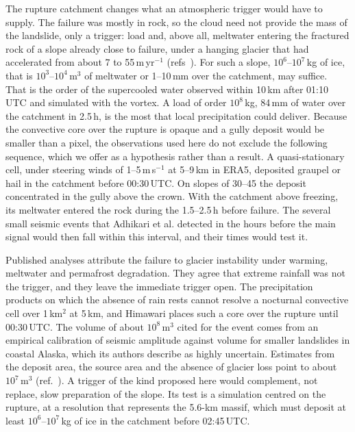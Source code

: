 \documentclass{nature}
\begin{document}
The rupture catchment changes what an atmospheric trigger would have to supply. The failure was mostly in rock\cite{adhikari2026,petley2026}, so the cloud need not provide the mass of the landslide, only a trigger: load and, above all, meltwater entering the fractured rock of a slope already close to failure, under a hanging glacier that had accelerated from about 7 to 55\,m\,yr$^{-1}$ (refs~). For such a slope, $10^{6}$--$10^{7}$\,kg of ice, that is $10^{3}$--$10^{4}$\,m$^{3}$ of meltwater or 1--10\,mm over the catchment, may suffice. That is the order of the supercooled water observed within 10\,km after 01:10\,UTC and simulated with the vortex. A load of order $10^{8}$\,kg, 84\,mm of water over the catchment in 2.5\,h, is the most that local precipitation could deliver. Because the convective core over the rupture is opaque and a gully deposit would be smaller than a pixel, the observations used here do not exclude the following sequence, which we offer as a hypothesis rather than a result. A quasi-stationary cell, under steering winds of 1--5\,m\,s$^{-1}$ at 5--9\,km in ERA5, deposited graupel or hail in the catchment before 00:30\,UTC. On slopes of 30--45\textdegree{} the deposit concentrated in the gully above the crown. With the catchment above freezing, its meltwater entered the rock during the 1.5--2.5\,h before failure. The several small seismic events that Adhikari et al. detected in the hours before the main signal\cite{adhikari2026} would then fall within this interval, and their times would test it.

Published analyses attribute the failure to glacier instability under warming, meltwater and permafrost degradation\cite{wang2026,cas2026,icimod2026}. They agree that extreme rainfall was not the trigger\cite{li2026arxiv,cas2026}, and they leave the immediate trigger open\cite{icimod2026,li2026arxiv}. The precipitation products on which the absence of rain rests cannot resolve a nocturnal convective cell over 1\,km$^{2}$ at 5\,km, and Himawari places such a core over the rupture until 00:30\,UTC. The volume of about $10^{8}$\,m$^{3}$ cited for the event\cite{adhikari2026} comes from an empirical calibration of seismic amplitude against volume for smaller landslides in coastal Alaska\cite{karasozen2024}, which its authors describe as highly uncertain. Estimates from the deposit area, the source area and the absence of glacier loss point to about $10^{7}$\,m$^{3}$ (ref.~). A trigger of the kind proposed here would complement, not replace, slow preparation of the slope. Its test is a simulation centred on the rupture, at a resolution that represents the 5.6-km massif, which must deposit at least $10^{6}$--$10^{7}$\,kg of ice in the catchment before 02:45\,UTC.
\end{document}
